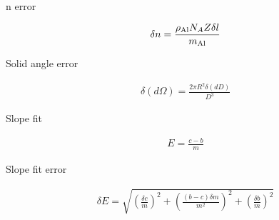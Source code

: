 n error

\begin{align}
	\delta n = \frac{\rho_{\rm Al} N_A Z \delta l}{m_{\rm Al}}
\end{align}

Solid angle error

\begin{align}
	\delta (d\Omega)=
		\frac{2 \pi R^2 \delta (dD)}{D^3}
\end{align}

Slope fit

\begin{align}
	E=\frac{c-b}{m}
\end{align}

Slope fit error

\begin{align}
    \delta E = \sqrt{
    \left(\frac{\delta c}{m}\right)^2+
    \left(\frac{(b-c)\delta m}{m^2}\right)^2+
    \left(\frac{\delta b}{m}\right)^2
	}
\end{align}

